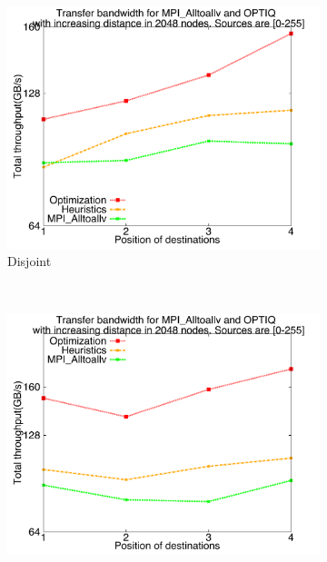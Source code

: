 \begin{figure}[!htbp]
        \centering
        \begin{subfigure}[b]{0.32\textwidth}
                \includegraphics[width=\textwidth]{figures/incrdist_disjoint.pdf}
                \caption{Disjoint}
                \label{fig:incrdist_disjoint}
        \end{subfigure}%
        ~ %
        \begin{subfigure}[b]{0.32\textwidth}
                \includegraphics[width=\textwidth]{figures/incrdist_overlap}

\end{subfigure}
\end{figure}
